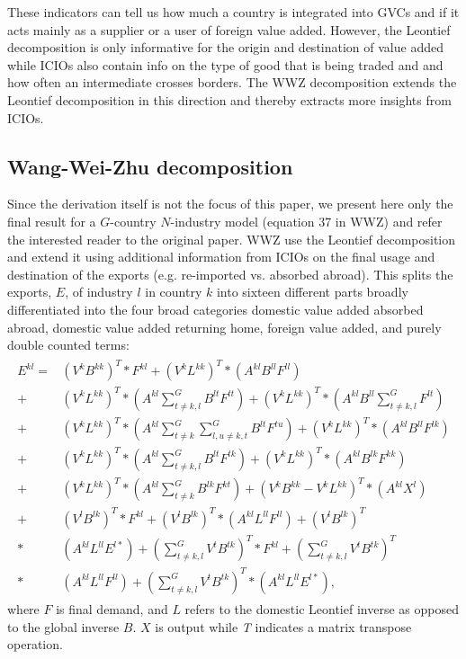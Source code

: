\documentclass[11pt,a4paper]{article}
\begin{document}
These indicators can tell us how much a country is integrated into GVCs and if it acts mainly as a supplier or a user of foreign value added. However, the Leontief decomposition is only informative for the origin and destination of value added while ICIOs also contain info on the type of good that is being traded and and how often an intermediate crosses borders. The WWZ decomposition extends the Leontief decomposition in this direction and thereby extracts more insights from ICIOs.


\subsection{Wang-Wei-Zhu decomposition}\label{sub:wwz}

Since the derivation itself is not the focus of this paper, we present here only the final result for a $G$-country $N$-industry model (equation 37 in WWZ) and refer the interested reader to the original paper. WWZ use the Leontief decomposition and extend it using additional information from ICIOs on the final usage and destination of the exports (e.g. re-imported vs. absorbed abroad). This splits the exports, $E$, of industry $l$ in country $k$ into sixteen different parts broadly differentiated into the four broad categories domestic value added absorbed abroad, domestic value added returning home, foreign value added, and purely double counted terms:
\begin{align}\label{eq:wwz}
\begin{split}
E^{kl}
= &\left(V^k B^{kk} \right)^T * F^{kl} 
+ \left(V^k L^{kk} \right)^T * \left(A^{kl} B^{ll} F^{ll} \right)\\
+& \left(V^k L^{kk} \right)^T * (A^{kl} \sum_{t \neq k,l}^G  B^{lt} F^{tt} )
+ \left(V^k L^{kk} \right)^T *  (A^{kl} B^{ll} \sum_{t \neq k,l}^G  F^{lt} )\\ 
+&  \left(V^k L^{kk} \right)^T * (A^{kl} \sum_{t \neq k}^G \sum_{l,u \neq k,t}^G B^{lt} F^{tu} )
+ \left(V^k L^{kk} \right)^T * \left(A^{kl} B^{ll} F^{lk} \right)\\
+& \left(V^k L^{kk} \right)^T * (A^{kl} \sum_{t \neq k,l}^G  B^{lt} F^{tk} )
+ \left(V^k L^{kk} \right)^T * \left(A^{kl} B^{lk} F^{kk} \right) \\
+& \left(V^k L^{kk} \right)^T * (A^{kl} \sum_{t \neq k}^G  B^{lk} F^{kt} )
+ \left(V^k B^{kk} -  V^k L^{kk} \right)^T * \left(A^{kl} X^{l}  \right)\\
+& \left(V^l B^{lk} \right)^T * F^{kl}
+ \left(V^l B^{lk} \right)^T *  \left(A^{kl} L^{ll} F^{ll} \right)
+ \left(V^l B^{lk} \right)^T \\
*&  \left(A^{kl} L^{ll} E^{l*} \right) + (\sum_{t \neq k,l}^G  V^{t} B^{tk} )^{T} * F^{kl}
+ (\sum_{t \neq k,l}^G  V^{t} B^{tk} )^{T}\\
*&   \left(A^{kl} L^{ll} F^{ll} \right) + (\sum_{t \neq k,l}^G  V^{t} B^{tk} )^{T} *  \left(A^{kl} L^{ll} E^{l*} \right) ,
\end{split}
\end{align}
where $F$ is final demand, and $L$ refers to the domestic Leontief inverse as opposed to the global inverse $B$. $X$ is output while \textit{T} indicates a matrix transpose operation. 
\end{document}
